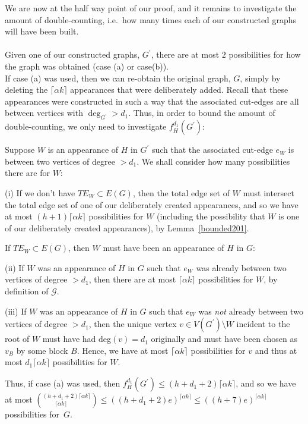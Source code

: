 \documentclass{article}
\newtheorem{Proof of Theorem}{Proof of Theorem}
\begin{document}
We are now at the half way point of our proof,
and it remains to investigate the amount of double-counting,
i.e.~how many times each of our constructed graphs will have been built. \\
\\

Given one of our constructed graphs, $G^{\prime}$,
there are at most $2$ possibilities for how the graph was obtained (case (a) or case(b)). \\

If case (a) was used, then we can re-obtain the original graph, $G$,
simply by deleting the $\lceil \alpha k \rceil$ appearances that were deliberately added.
Recall that these appearances were constructed in such a way that the associated cut-edges
are all between vertices with $\deg_{G^{\prime}}>d_{1}$.
Thus, in order to bound the amount of double-counting,
we only need to investigate $f_{H}^{d_{1}}(G^{\prime})$:

Suppose $W$ is an appearance of $H$ in $G^{\prime}$ such that the associated cut-edge $e_{W}$
is between two vertices of degree $>d_{1}$.
We shall consider how many possibilities there are for $W$:

(i) If we don't have $TE_{W} \subset E(G)$,
then the total edge set of $W$ must intersect the total edge set of one of our deliberately created appearances,
and so we have at most $(h+1) \lceil \alpha k \rceil$ possibilities for $W$
(including the possibility that $W$ is one of our deliberately created appearances),
by Lemma~\ref{bounded201}.

If $TE_{W} \subset E(G)$,
then $W$ must have been an appearance of $H$ in $G$:

(ii) If $W$ was an appearance of $H$ in $G$ such that
$e_{W}$ was already between two vertices of degree $>d_{1}$,
then there are at most $\lceil \alpha k \rceil$ possibilities for $W$,
by definition of $\mathcal{G}$.

(iii) If $W$ was an appearance of $H$ in $G$ such that 
$e_{W}$ was \textit{not} already between two vertices of degree $>d_{1}$,
then the unique vertex $v \in V(G^{\prime}) \setminus W$
incident to the root of $W$ must have had deg$(v) = d_{1}$ originally
and must have been chosen as $v_{B}$ by some block $B$.
Hence, we have at most $\lceil \alpha k \rceil$ possibilities for $v$
and thus at most $d_{1} \lceil \alpha k \rceil$ possibilities for $W$.

Thus, if case (a) was used, 
then $f_{H}^{d_{1}} (G^{\prime}) \leq (h+d_{1}+2) \lceil \alpha k \rceil$,
and so we have at most 
$\left( ^{(h+d_{1}+2) \lceil \alpha k \rceil}_{\phantom{www} \lceil \alpha k \rceil} \right)
\leq ((h+d_{1}+2)e)^{\lceil \alpha k \rceil}
\leq ((h+7)e)^{\lceil \alpha k \rceil}$
possibilities for~$G$. \\
\end{document}

